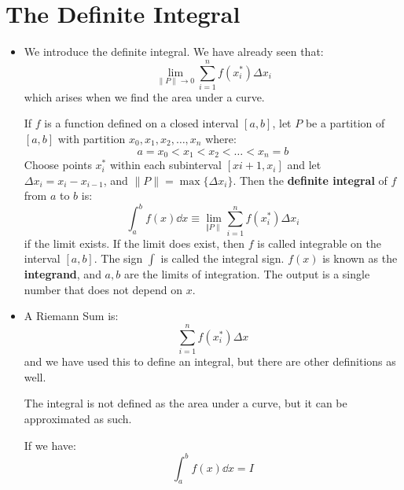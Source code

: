 \section{The Definite Integral}
\begin{itemize}
    \item We introduce the definite integral. We have already seen that:
    \begin{equation}
        \lim_{\lVert P\rVert \to 0} \sum_{i=1}^n f(x_i^*) \Delta x_i
        \label{eq:}
    \end{equation}
    which arises when we find the area under a curve.
    \begin{definition}
        If $f$ is a function defined on a closed interval $[a,b]$, let $P$ be a partition of $[a,b]$ with partition $x_0,x_1,x_2,\dots,x_n$ where:
        \begin{equation}
            a=x_0<x_1<x_2<\dots<x_n=b
            \label{eq:}
        \end{equation}
        Choose points $x_i^*$ within each subinterval $[x{i+1},x_i]$ and let $\Delta x_i=x_i-x_{i-1}$, and $\lVert P \rVert =\max\{\Delta x_i\}$. Then the \textbf{definite integral} of $f$ from $a$ to $b$ is:
        \begin{equation}
            \int_a^b f(x) \dd{x} \equiv \lim_{\Vert P \rVert} \sum_{i=1}^n f(x_i^*)\Delta x_i
            \label{eq:}
        \end{equation}
        if the limit exists. If the limit does exist, then $f$ is called integrable on the interval $[a,b]$. The sign $\int$ is called the integral sign. $f(x)$ is known as the \textbf{integrand}, and $a,b$ are the limits of integration. The output is a single number that does not depend on $x$.
    \end{definition}
    \item A Riemann Sum is:
    \begin{equation}
        \sum_{i=1}^n f(x_i^*)\Delta x
        \label{eq:}
    \end{equation}
    and we have used this to define an integral, but there are other definitions as well.
    \begin{warning}
        The integral is not defined as the area under a curve, but it can be approximated as such.
    \end{warning}
    \begin{idea}
        If we have:
        \begin{equation}
            \int_a^b f(x) \dd{x} = I
            \label{eq:}
        \end{equation}

\end{idea}
\end{itemize}
